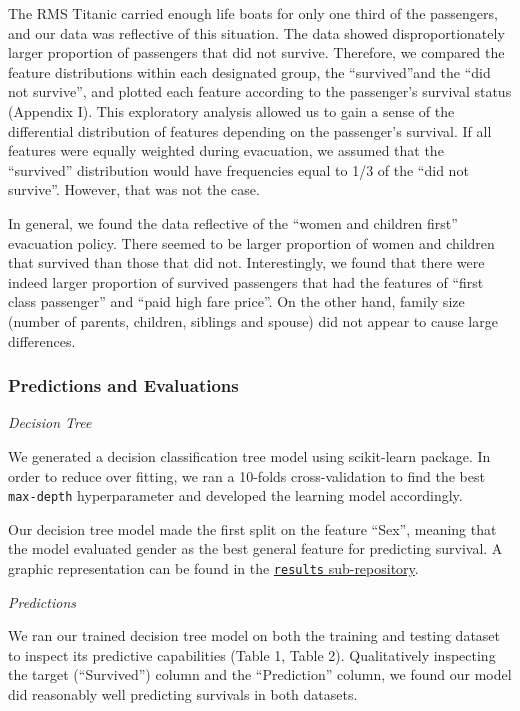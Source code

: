 \documentclass[]{article}
\begin{document}
The RMS Titanic carried enough life boats for only one third of the
passengers, and our data was reflective of this situation. The data
showed disproportionately larger proportion of passengers that did not
survive. Therefore, we compared the feature distributions within each
designated group, the ``survived''and the ``did not survive'', and
plotted each feature according to the passenger's survival status
(Appendix I). This exploratory analysis allowed us to gain a sense of
the differential distribution of features depending on the passenger's
survival. If all features were equally weighted during evacuation, we
assumed that the ``survived'' distribution would have frequencies equal
to 1/3 of the ``did not survive''. However, that was not the case.

In general, we found the data reflective of the ``women and children
first'' evacuation policy. There seemed to be larger proportion of women
and children that survived than those that did not. Interestingly, we
found that there were indeed larger proportion of survived passengers
that had the features of ``first class passenger'' and ``paid high fare
price''. On the other hand, family size (number of parents, children,
siblings and spouse) did not appear to cause large differences.

\newpage

\subsubsection{Predictions and
Evaluations}\label{predictions-and-evaluations}

\emph{Decision Tree}

We generated a decision classification tree model using scikit-learn
package. In order to reduce over fitting, we ran a 10-folds
cross-validation to find the best \texttt{max-depth} hyperparameter and
developed the learning model accordingly.

Our decision tree model made the first split on the feature ``Sex'',
meaning that the model evaluated gender as the best general feature for
predicting survival. A graphic representation can be found in the
\href{https://github.com/UBC-MDS/sylvia_patrick_Titanic_Survival_ML/blob/master/results/decision_tree.png}{\texttt{results}
sub-repository}.

\emph{Predictions}

We ran our trained decision tree model on both the training and testing
dataset to inspect its predictive capabilities (Table 1, Table 2).
Qualitatively inspecting the target (``Survived'') column and the
``Prediction'' column, we found our model did reasonably well predicting
survivals in both datasets.
\end{document}
